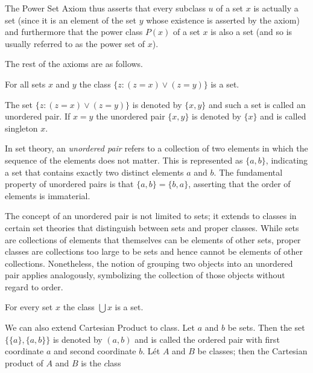         The Power Set Axiom thus asserts that every subclass \( u \) of a set \( x \) is actually a set (since it is an element of the set \( y \) whose existence is asserted by the axiom) and furthermore that the power class \( P(x) \) of a set \( x \) is also a set (and so is usually referred to as the power set of \( x \)).
        
        The rest of the axioms are as follows.
        \begin{axiom}
        For all sets \( x \) and \( y \) the class \( \{z : (z = x) \vee (z = y)\} \) is a set.
        \end{axiom}
        
        The set \( \{z : (z = x) \vee (z = y)\} \) is denoted by \( \{x, y\} \) and such a set is called an 
        unordered pair. If \( x = y \) the unordered pair \( \{x, y\} \) is denoted by \( \{x\} \) and is 
        called singleton \( x \).
        \begin{remark}
            In set theory, an \emph{unordered pair} refers to a collection of two elements in which the sequence of the elements does not matter. This is represented as $\{a, b\}$, indicating a set that contains exactly two distinct elements $a$ and $b$. The fundamental property of unordered pairs is that $\{a, b\} = \{b, a\}$, asserting that the order of elements is immaterial.

The concept of an unordered pair is not limited to sets; it extends to classes in certain set theories that distinguish between sets and proper classes. While sets are collections of elements that themselves can be elements of other sets, proper classes are collections too large to be sets and hence cannot be elements of other collections. Nonetheless, the notion of grouping two objects into an unordered pair applies analogously, symbolizing the collection of those objects without regard to order.
        \end{remark}
        \begin{axiom}
        For every set \( x \) the class \( \bigcup x \) is a set.
        \end{axiom}

        We can also extend Cartesian Product to class.
        Let $a$ and $b$ be sets. Then the set $\{\{a\},\{a,b\}\}$ is denoted by $(a,b)$ and is called the ordered pair with first coordinate $a$ and second coordinate $b$. Lét $A$ and $B$ be classes; then the Cartesian product of $A$ and $B$ is the $c$lass

